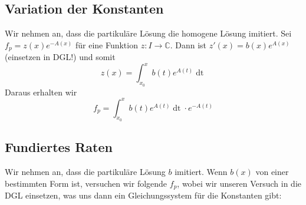 \documentclass[a4paper,10pt]{article}
\def\C{\mathbb{C}}
\begin{document}
\subsection{Variation der Konstanten}
Wir nehmen an, dass die partikuläre Lösung die homogene Lösung imitiert. Sei \(f_p = z(x)e^{-A(x)}\) für eine Funktion \(z: I \to \C\). Dann ist \(z'(x) = b(x) e^{A(x)}\) (einsetzen in DGL!) und somit \[z(x) = \int_{x_0}^x b(t) e^{A(t)} \mathop{dt}\] Daraus erhalten wir \[f_p = \int_{x_0}^x b(t) e^{A(t)} \mathop{dt} \cdot e^{-A(t)}\]

\subsection{Fundiertes Raten}

Wir nehmen an, dass die partikuläre Lösung $b$ imitiert. Wenn $b(x)$ von einer bestimmten Form ist, versuchen wir folgende $f_p$, wobei wir unseren Versuch in die DGL einsetzen, was uns dann ein Gleichungssystem für die Konstanten gibt:
\end{document}
